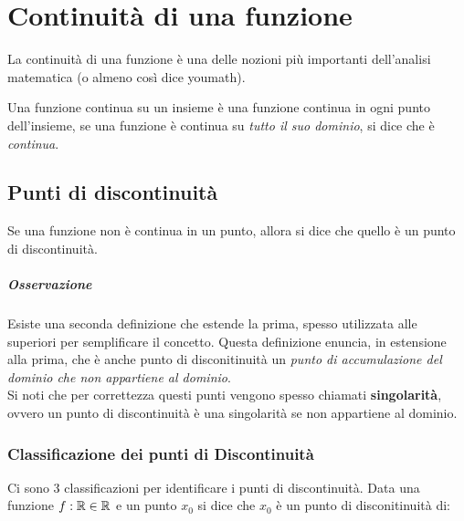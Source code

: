 \documentclass[12pt, a4paper, openany]{book}
\begin{document}

	\section{Continuità di una funzione}
	La continuità di una funzione è una delle nozioni più importanti dell'analisi matematica (o almeno così dice youmath).

	Una funzione continua su un insieme è una funzione continua in ogni punto dell'insieme, se una funzione è continua su \emph{tutto il suo dominio}, si dice che è \emph{continua}.

	\subsection*{Punti di discontinuità}
	Se una funzione non è continua in un punto, allora si dice che quello è un punto di discontinuità.


	\subparagraph*{Osservazione} Esiste una seconda definizione che estende la prima, spesso utilizzata alle superiori per semplificare il concetto.
	Questa definizione enuncia, in estensione alla prima, che è anche punto di disconitinuità un \emph{punto di accumulazione del dominio che non appartiene al dominio}.
	\\Si noti che per correttezza questi punti vengono spesso chiamati \textbf{singolarità}, ovvero un punto di discontinuità è una singolarità se non appartiene al dominio.
	\subsubsection*{Classificazione dei punti di Discontinuità}
	Ci sono 3 classificazioni per identificare i punti di discontinuità.
	Data una funzione $f:\mathbb{R} \in \mathbb{R}$ e un punto $x_0$ si dice che $x_0$ è un punto di disconitinuità di:
\end{document}
